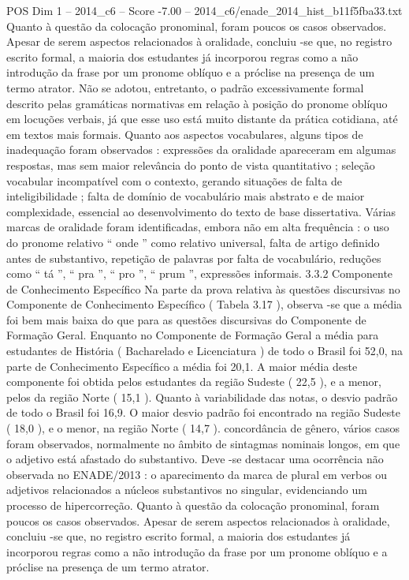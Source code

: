 \begin{textsample}{POS Dim 1 – 2014\_c6 – Score -7.00 – 2014\_c6/enade\_2014\_hist\_b11f5fba33.txt}
Quanto à questão da colocação pronominal, foram poucos os casos observados.
Apesar de serem aspectos relacionados à oralidade, concluiu -se que, no registro escrito formal, a maioria dos estudantes já incorporou regras como a não introdução da frase por um pronome oblíquo e a próclise na presença de um termo atrator.
Não se adotou, entretanto, o padrão excessivamente formal descrito pelas gramáticas normativas em relação à posição do pronome oblíquo em locuções verbais, já que esse uso está muito distante da prática cotidiana, até em textos mais formais.
Quanto aos aspectos vocabulares, alguns tipos de inadequação foram observados : expressões da oralidade apareceram em algumas respostas, mas sem maior relevância do ponto de vista quantitativo ; seleção vocabular incompatível com o contexto, gerando situações de falta de inteligibilidade ; falta de domínio de vocabulário mais abstrato e de maior complexidade, essencial ao desenvolvimento do texto de base dissertativa.
Várias marcas de oralidade foram identificadas, embora não em alta frequência : o uso do pronome relativo “ onde ” como relativo universal, falta de artigo definido antes de substantivo, repetição de palavras por falta de vocabulário, reduções como “ tá ”, “ pra ”, “ pro ”, “ prum ”, expressões informais. 3.3.2 Componente de Conhecimento Específico Na parte da prova relativa às questões discursivas no Componente de Conhecimento Específico ( Tabela 3.17 ), observa -se que a média foi bem mais baixa do que para as questões discursivas do Componente de Formação Geral.
Enquanto no Componente de Formação Geral a média para estudantes de História ( Bacharelado e Licenciatura ) de todo o Brasil foi 52,0, na parte de Conhecimento Específico a média foi 20,1.
A maior média deste componente foi obtida pelos estudantes da região Sudeste ( 22,5 ), e a menor, pelos da região Norte ( 15,1 ).
Quanto à variabilidade das notas, o desvio padrão de todo o Brasil foi 16,9.
O maior desvio padrão foi encontrado na região Sudeste ( 18,0 ), e o menor, na região Norte ( 14,7 ). concordância de gênero, vários casos foram observados, normalmente no âmbito de sintagmas nominais longos, em que o adjetivo está afastado do substantivo.
Deve -se destacar uma ocorrência não observada no ENADE/2013 : o aparecimento da marca de plural em verbos ou adjetivos relacionados a núcleos substantivos no singular, evidenciando um processo de hipercorreção.
Quanto à questão da colocação pronominal, foram poucos os casos observados.
Apesar de serem aspectos relacionados à oralidade, concluiu -se que, no registro escrito formal, a maioria dos estudantes já incorporou regras como a não introdução da frase por um pronome oblíquo e a próclise na presença de um termo atrator.

\end{textsample}
